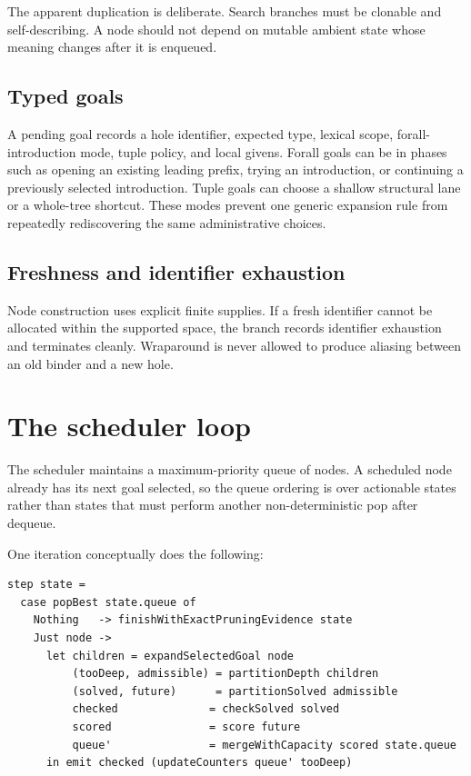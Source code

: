 \documentclass[10pt,letterpaper,oneside]{report}
\begin{document}
The apparent duplication is deliberate. Search branches must be clonable and self-describing. A node should not depend on mutable ambient state whose meaning changes after it is enqueued.

\subsection{Typed goals}

A pending goal records a hole identifier, expected type, lexical scope, forall-introduction mode, tuple policy, and local givens. Forall goals can be in phases such as opening an existing leading prefix, trying an introduction, or continuing a previously selected introduction. Tuple goals can choose a shallow structural lane or a whole-tree shortcut. These modes prevent one generic expansion rule from repeatedly rediscovering the same administrative choices.

\subsection{Freshness and identifier exhaustion}

Node construction uses explicit finite supplies. If a fresh identifier cannot be allocated within the supported space, the branch records identifier exhaustion and terminates cleanly. Wraparound is never allowed to produce aliasing between an old binder and a new hole.

\section{The scheduler loop}\label{sec:exference-scheduler}

The scheduler maintains a maximum-priority queue of nodes. A scheduled node already has its next goal selected, so the queue ordering is over actionable states rather than states that must perform another non-deterministic pop after dequeue.

One iteration conceptually does the following:

\begin{lstlisting}[language=Haskellish]
step state =
  case popBest state.queue of
    Nothing   -> finishWithExactPruningEvidence state
    Just node ->
      let children = expandSelectedGoal node
          (tooDeep, admissible) = partitionDepth children
          (solved, future)      = partitionSolved admissible
          checked              = checkSolved solved
          scored               = score future
          queue'               = mergeWithCapacity scored state.queue
      in emit checked (updateCounters queue' tooDeep)
\end{lstlisting}
\end{document}
